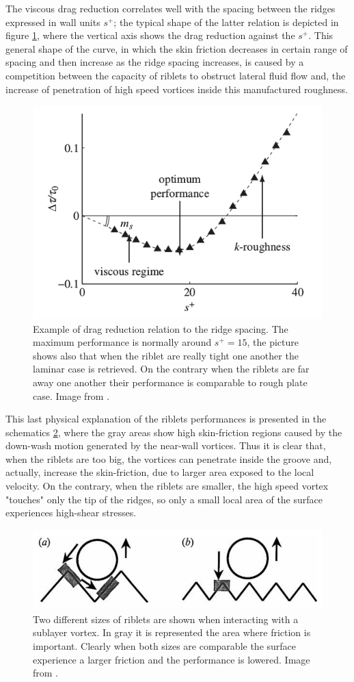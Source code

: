 The viscous drag reduction correlates well with the spacing between the ridges expressed in wall units $ s^+ $; the typical shape of the latter relation is depicted in figure \ref{fig:riblets_perf}, where the vertical axis shows the drag reduction against the $ s^+ $.
This general shape of the curve, in which the skin friction decreases in certain range of spacing and then increase as the ridge spacing  increases, is caused by a competition between the capacity of riblets to obstruct lateral fluid flow and, the increase of penetration of high speed vortices inside this manufactured roughness.

\begin{figure}[h]
	\centering
	\includegraphics[width=0.5\linewidth]{chapter_1/riblets_performance}
	\caption{Example of drag reduction relation to the ridge spacing. The maximum performance is normally around $ s^+ = 15 $, the picture shows also that when the riblet are really tight one another the laminar case is retrieved. On the contrary when the riblets are far away one another their performance is comparable to rough plate case. Image from \citet{jimenez2001turbulent}. }
	\label{fig:riblets_perf}
\end{figure}

This last physical explanation of the riblets performances is presented in the schematics \ref{fig:riblets_schem}, where the gray areas show high skin-friction regions caused by the down-wash motion generated by the near-wall vortices.
Thus it is clear that, when the riblets are too big, the vortices can penetrate inside the groove and, actually, increase the skin-friction, due to larger area exposed to the local velocity.
On the contrary, when the riblets are smaller, the high speed vortex "touches" only the tip of the ridges, so only a small local area of the surface experiences high-shear stresses.

\begin{figure}[h]
	\centering
	\includegraphics[width=0.7\linewidth]{chapter_1/riblets1}
	\caption{Two different sizes of riblets are shown when interacting with a sublayer vortex. In gray it is represented the area where friction is important. Clearly when both sizes are comparable the surface experience a larger friction and the performance is lowered. Image from \citet{choi1993direct}.}
	\label{fig:riblets_schem}
\end{figure}

